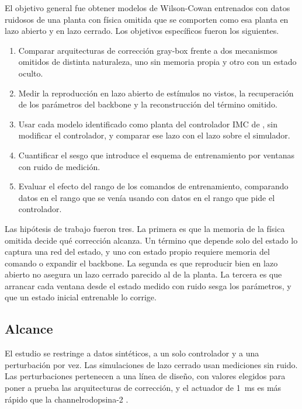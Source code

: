\documentclass[11pt,a4paper]{article}
\begin{document}
El objetivo general fue obtener modelos de Wilson-Cowan entrenados con datos ruidosos de una planta con física omitida que se comporten como esa planta en lazo abierto y en lazo cerrado. Los objetivos específicos fueron los siguientes.

\begin{enumerate}[leftmargin=*,itemsep=0.2em]
\item Comparar arquitecturas de corrección gray-box frente a dos mecanismos omitidos de distinta naturaleza, uno sin memoria propia y otro con un estado oculto.
\item Medir la reproducción en lazo abierto de estímulos no vistos, la recuperación de los parámetros del backbone y la reconstrucción del término omitido.
\item Usar cada modelo identificado como planta del controlador IMC de \cite{martinez2022ifac}, sin modificar el controlador, y comparar ese lazo con el lazo sobre el simulador.
\item Cuantificar el sesgo que introduce el esquema de entrenamiento por ventanas con ruido de medición.
\item Evaluar el efecto del rango de los comandos de entrenamiento, comparando datos en el rango que se venía usando con datos en el rango que pide el controlador.
\end{enumerate}

Las hipótesis de trabajo fueron tres. La primera es que la memoria de la física omitida decide qué corrección alcanza. Un término que depende solo del estado lo captura una red del estado, y uno con estado propio requiere memoria del comando o expandir el backbone. La segunda es que reproducir bien en lazo abierto no asegura un lazo cerrado parecido al de la planta. La tercera es que arrancar cada ventana desde el estado medido con ruido sesga los parámetros, y que un estado inicial entrenable lo corrige.

\subsection{Alcance}

El estudio se restringe a datos sintéticos, a un solo controlador y a una perturbación por vez. Las simulaciones de lazo cerrado usan mediciones sin ruido. Las perturbaciones pertenecen a una línea de diseño, con valores elegidos para poner a prueba las arquitecturas de corrección, y el actuador de 1~ms es más rápido que la channelrodopsina-2 \cite{williams2013,tchumatchenko2013}.
\end{document}
